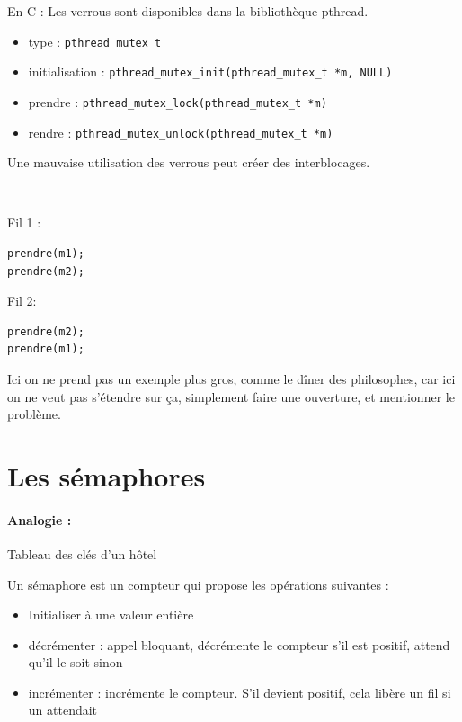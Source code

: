 \begin{impl}
	\normalfont
	En C : Les verrous sont disponibles dans la bibliothèque pthread. \begin{itemize}[label=]
		\item type : \texttt{pthread\_mutex\_t}
		\item initialisation : \texttt{pthread\_mutex\_init(pthread\_mutex\_t *m, NULL)}
		\item prendre : \texttt{pthread\_mutex\_lock(pthread\_mutex\_t *m)}
		\item rendre : \texttt{pthread\_mutex\_unlock(pthread\_mutex\_t *m)}
	\end{itemize}
\end{impl}

\begin{rem}
	Une mauvaise utilisation des verrous peut créer des interblocages.
\end{rem}

\begin{example} \enspace\\ \normalfont
	\begin{minipage}{0.3\linewidth}
	Fil 1 :
	\begin{lstlisting}[style=CStyle]
prendre(m1);
prendre(m2);\end{lstlisting}
\end{minipage} \quad
\begin{minipage}{0.3\linewidth}
	Fil 2:
	\begin{lstlisting}[style=CStyle]
prendre(m2);
prendre(m1);\end{lstlisting}
\end{minipage}
\end{example}

\begin{com}
	Ici on ne prend pas un exemple plus gros, comme le dîner des philosophes, car ici on ne veut pas s'étendre sur ça, simplement faire une ouverture, et mentionner le problème.
\end{com}

\section{Les sémaphores}

\paragraph{Analogie :} Tableau des clés d'un hôtel

\begin{definition}
	Un sémaphore est un compteur qui propose les opérations suivantes :
	\begin{itemize}
		\item Initialiser à une valeur entière
		\item décrémenter : appel bloquant, décrémente le compteur s'il est positif, attend qu'il le soit sinon
		\item incrémenter : incrémente le compteur. S'il devient positif, cela libère un fil si un attendait
	\end{itemize} 
\end{definition}

